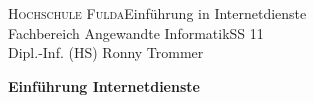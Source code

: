 \documentclass[a4paper,11pt]{article}
\begin{document}

\textsc{Hochschule Fulda}{\small\hfill Einführung in Internetdienste}\\
{\small Fachbereich Angewandte Informatik{\small\hfill SS 11}\\
Dipl.-Inf. (HS) Ronny Trommer}\\

\begin{center}
{\Large\textbf{Einführung Internetdienste}}\\

\medskip
\end{center}

\smallskip

\newcommand{\half}{{\scriptstyle\frac{1}{2}}}

\newcommand{\setK}{\mathbbm{K}}
\newcommand{\setR}{\mathbbm{R}}
\newcommand{\setZ}{\mathbbm{Z}}
\tableofcontents

\pagebreak



\end{document}
